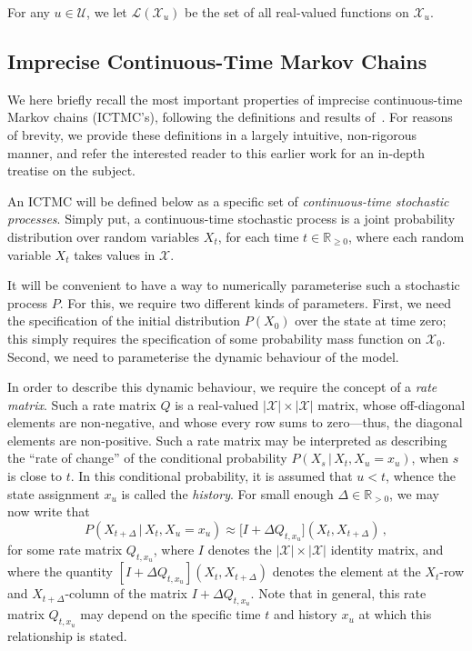 \documentclass[twoside,11pt]{article}
\newcommand{\reals}{\mathbb{R}}
\newcommand{\realspos}{\reals_{>0}}
\newcommand{\realsnonneg}{\reals_{\geq 0}}
\newcommand{\states}{\mathcal{X}}
\newcommand{\gambles}{\mathcal{L}}
\begin{document}
For any $u\in\mathcal{U}$, we let $\gambles(\states_u)$ be the set of all real-valued functions on $\states_u$.

\subsection{Imprecise Continuous-Time Markov Chains}\label{subsec:ictmc}

We here briefly recall the most important properties of imprecise continuous-time Markov chains (ICTMC's), following the definitions and results of~\citet{krak2016ictmc}. For reasons of brevity, we provide these definitions in a largely intuitive, non-rigorous manner, and refer the interested reader to this earlier work for an in-depth treatise on the subject.

An ICTMC will be defined below as a specific set of \emph{continuous-time stochastic processes}. Simply put, a continuous-time stochastic process is a joint probability distribution over random variables $X_t$, for each time $t\in\realsnonneg$, where each random variable $X_t$ takes values in $\states$. 


It will be convenient to have a way to numerically parameterise such a stochastic process $P$. For this, we require two different kinds of parameters. First, we need the specification of the initial distribution $P(X_0)$ over the state at time zero; this simply requires the specification of some probability mass function on $\states_0$. Second, we need to parameterise the dynamic behaviour of the model.

In order to describe this dynamic behaviour, we require the concept of a \emph{rate matrix}. Such a rate matrix $Q$ is a real-valued $\lvert\states\rvert\times\lvert\states\rvert$ matrix, whose off-diagonal elements are non-negative, and whose every row sums to zero---thus, the diagonal elements are non-positive. Such a rate matrix may be interpreted as describing the ``rate of change'' of the conditional probability $P(X_s\,\vert\,X_t,X_u=x_u)$, when $s$ is close to $t$. In this conditional probability, it is assumed that $u<t$, whence the state assignment $x_u$ is called the \emph{history}. For small enough $\Delta\in\realspos$, we may now write that
\begin{equation*}
P(X_{t+\Delta}\,\vert\,X_t,X_u=x_u) \approx \bigl[I + \Delta Q_{t,x_u}\bigr](X_t, X_{t+\Delta})\,,
\end{equation*}
for some rate matrix $Q_{t,x_u}$, where $I$ denotes the $\lvert\states\rvert\times\lvert\states\rvert$ identity matrix, and where the quantity $[I + \Delta Q_{t,x_u}](X_t,X_{t+\Delta})$ denotes the element at the $X_t$-row and $X_{t+\Delta}$-column of the matrix $I + \Delta Q_{t,x_u}$. Note that in general, this rate matrix $Q_{t,x_u}$ may depend on the specific time $t$ and history $x_u$ at which this relationship is stated. 
\end{document}
